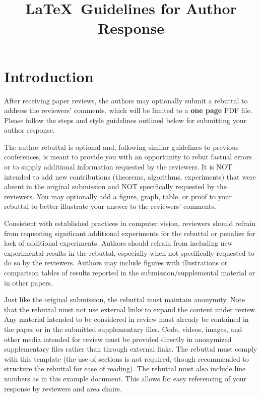 \documentclass[10pt,twocolumn,letterpaper]{article}
\begin{document}
\title{\LaTeX\ Guidelines for Author Response}  %

\maketitle
\thispagestyle{empty}
\appendix


\section{Introduction}

After receiving paper reviews, the authors may optionally submit a rebuttal to address the reviewers' comments, which will be limited to a {\bf one page} PDF file.
Please follow the steps and style guidelines outlined below for submitting your author response.

The author rebuttal is optional and, following similar guidelines to previous conferences, is meant to provide you with an opportunity to rebut factual errors or to supply additional information requested by the reviewers.
It is NOT intended to add new contributions (theorems, algorithms, experiments) that were absent in the original submission and NOT specifically requested by the reviewers.
You may optionally add a figure, graph, table, or proof to your rebuttal to better illustrate your answer to the reviewers' comments.

Consistent with established practices in computer vision, reviewers should refrain from requesting significant additional experiments for the rebuttal or penalize for lack of additional experiments.
Authors should refrain from including new experimental results in the rebuttal, especially when not specifically requested to do so by the reviewers.
Authors may include figures with illustrations or comparison tables of results reported in the submission/supplemental material or in other papers.

Just like the original submission, the rebuttal must maintain anonymity.
Note that the rebuttal must not use external links to expand the content under review.
Any material intended to be considered in review must already be contained in the paper or in the submitted supplementary files.
Code, videos, images, and other media intended for review must be provided directly in anonymized supplementary files rather than through external links.
The rebuttal must comply with this template (the use of sections is not required, though recommended to structure the rebuttal for ease of reading).
The rebuttal must also include line numbers as in this example document.
This allows for easy referencing of your response by reviewers and area chairs.
\end{document}
